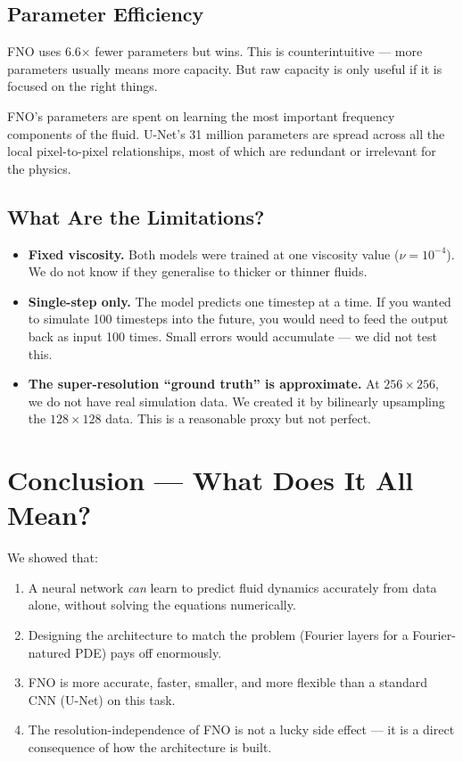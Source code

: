 \documentclass[11pt,twocolumn]{article}
\begin{document}
\subsection{Parameter Efficiency}

FNO uses 6.6$\times$ fewer parameters but wins.
This is counterintuitive --- more parameters usually means more capacity.
But raw capacity is only useful if it is focused on the right things.

FNO's parameters are spent on learning the most important frequency components
of the fluid.
U-Net's 31 million parameters are spread across all the local pixel-to-pixel
relationships, most of which are redundant or irrelevant for the physics.

\subsection{What Are the Limitations?}

\begin{itemize}
  \item \textbf{Fixed viscosity.}
        Both models were trained at one viscosity value ($\nu = 10^{-4}$).
        We do not know if they generalise to thicker or thinner fluids.

  \item \textbf{Single-step only.}
        The model predicts one timestep at a time.
        If you wanted to simulate 100 timesteps into the future, you would need
        to feed the output back as input 100 times.
        Small errors would accumulate --- we did not test this.

  \item \textbf{The super-resolution ``ground truth'' is approximate.}
        At $256 \times 256$, we do not have real simulation data.
        We created it by bilinearly upsampling the $128 \times 128$ data.
        This is a reasonable proxy but not perfect.
\end{itemize}

\section{Conclusion --- What Does It All Mean?}

We showed that:
\begin{enumerate}
  \item A neural network \emph{can} learn to predict fluid dynamics accurately
        from data alone, without solving the equations numerically.
  \item Designing the architecture to match the problem (Fourier layers for a
        Fourier-natured PDE) pays off enormously.
  \item FNO is more accurate, faster, smaller, and more flexible than a
        standard CNN (U-Net) on this task.
  \item The resolution-independence of FNO is not a lucky side effect --- it
        is a direct consequence of how the architecture is built.
\end{enumerate}
\end{document}
